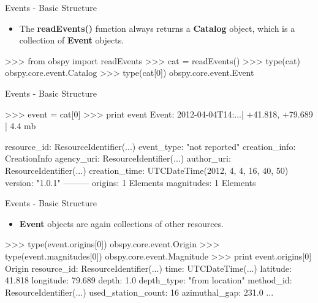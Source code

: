 \documentclass[handout]{beamer}
\begin{document}
\begin{frame}{Events - Basic Structure}
    \begin{itemize}
        \item The \textbf{readEvents()} function always returns a
            \textbf{Catalog} object, which is a collection of \textbf{Event}
            objects.
    \end{itemize}
\begin{myColorBox}{0.95}{}
\begin{python}
>>> from obspy import readEvents
>>> cat = readEvents()
>>> type(cat)
obspy.core.event.Catalog
>>> type(cat[0])
obspy.core.event.Event
\end{python}
\end{myColorBox}
\end{frame}

\begin{frame}{Events - Basic Structure}
\begin{myColorBox}{0.95}{}
\begin{python}
>>> event = cat[0]
>>> print event
Event:  2012-04-04T14:...| +41.818,  +79.689 | 4.4 mb

           resource_id: ResourceIdentifier(...)
            event_type: "not reported"
         creation_info: CreationInfo
            agency_uri: ResourceIdentifier(...)
            author_uri: ResourceIdentifier(...)
         creation_time: UTCDateTime(2012, 4, 4, 16, 40, 50)
               version: "1.0.1"
        ---------
                    origins: 1 Elements
                 magnitudes: 1 Elements
\end{python}
\end{myColorBox}
\end{frame}

\begin{frame}{Events - Basic Structure}
    \begin{itemize}
        \item \textbf{Event} objects are again collections of other resources.
    \end{itemize}
\begin{myColorBox}{0.95}{}
\begin{python}
>>> type(event.origins[0])
obspy.core.event.Origin
>>> type(event.magnitudes[0])
obspy.core.event.Magnitude
>>> print event.origins[0]
Origin
         resource_id: ResourceIdentifier(...)
                time: UTCDateTime(...)
            latitude: 41.818
           longitude: 79.689
               depth: 1.0
          depth_type: "from location"
           method_id: ResourceIdentifier(...)
  used_station_count: 16
       azimuthal_gap: 231.0
       ...
\end{python}
\end{myColorBox}
\end{frame}
\end{document}
